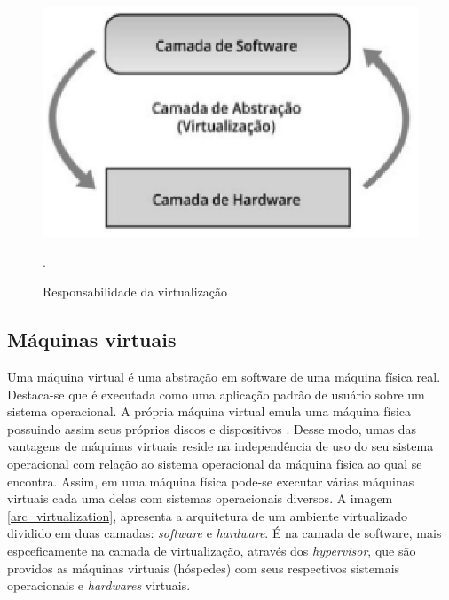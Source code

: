 \begin{figure}[!htb]
\centering
\includegraphics [keepaspectratio=true,scale=0.60]{figuras/virtualization_role.eps}
\caption{Responsabilidade da virtualização}
\cite{manoel}.
\label{virtualization_role}
\end{figure}

\subsection{Máquinas virtuais}
Uma máquina virtual é uma abstração em software de uma máquina física real. Destaca-se que é executada como uma aplicação padrão de usuário sobre um sistema operacional. A própria máquina virtual emula uma máquina física possuindo assim seus próprios discos e dispositivos \cite{mcewan}. Desse modo, umas das vantagens de máquinas virtuais reside na independência de uso do seu sistema operacional com relação ao sistema operacional da máquina física ao qual se encontra. Assim, em uma máquina física pode-se executar várias máquinas virtuais cada uma delas com sistemas operacionais diversos. A imagem \ref{arc_virtualization}, apresenta a arquitetura de um ambiente virtualizado dividido em duas camadas: \textit{software} e \textit{hardware}. É na camada de software, mais espceficamente na camada de virtualização, através dos \textit{hypervisor}, que são providos as máquinas virtuais (hóspedes) com seus respectivos sistemais operacionais e \textit{hardwares} virtuais.  

